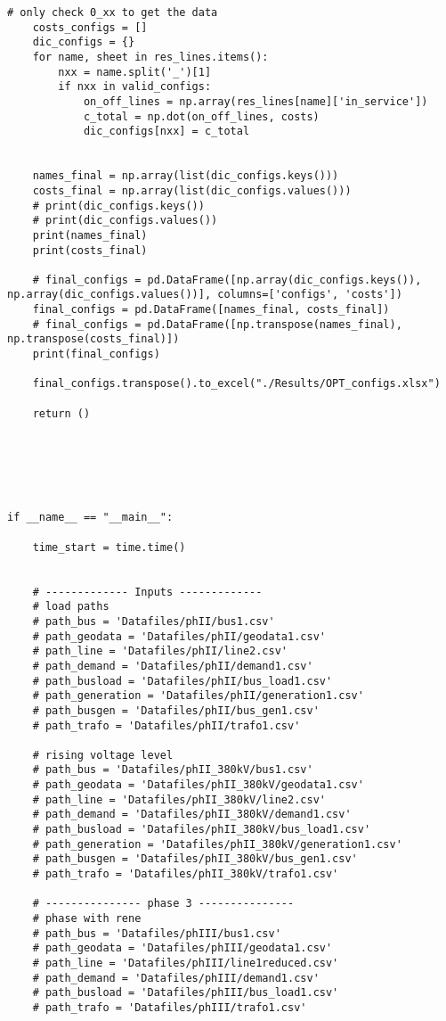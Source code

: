 \begin{lstlisting}[caption={Main code in Python with the Pandapower library}]
    # only check 0_xx to get the data
    costs_configs = []
    dic_configs = {}
    for name, sheet in res_lines.items():
        nxx = name.split('_')[1]
        if nxx in valid_configs:
            on_off_lines = np.array(res_lines[name]['in_service'])
            c_total = np.dot(on_off_lines, costs)
            dic_configs[nxx] = c_total


    names_final = np.array(list(dic_configs.keys()))
    costs_final = np.array(list(dic_configs.values()))
    # print(dic_configs.keys())
    # print(dic_configs.values())
    print(names_final)
    print(costs_final)

    # final_configs = pd.DataFrame([np.array(dic_configs.keys()), np.array(dic_configs.values())], columns=['configs', 'costs'])
    final_configs = pd.DataFrame([names_final, costs_final])
    # final_configs = pd.DataFrame([np.transpose(names_final), np.transpose(costs_final)])
    print(final_configs)

    final_configs.transpose().to_excel("./Results/OPT_configs.xlsx")

    return ()






if __name__ == "__main__":

    time_start = time.time()


    # ------------- Inputs -------------
    # load paths
    # path_bus = 'Datafiles/phII/bus1.csv'
    # path_geodata = 'Datafiles/phII/geodata1.csv'
    # path_line = 'Datafiles/phII/line2.csv'
    # path_demand = 'Datafiles/phII/demand1.csv'
    # path_busload = 'Datafiles/phII/bus_load1.csv'
    # path_generation = 'Datafiles/phII/generation1.csv'
    # path_busgen = 'Datafiles/phII/bus_gen1.csv'
    # path_trafo = 'Datafiles/phII/trafo1.csv'

    # rising voltage level
    # path_bus = 'Datafiles/phII_380kV/bus1.csv'
    # path_geodata = 'Datafiles/phII_380kV/geodata1.csv'
    # path_line = 'Datafiles/phII_380kV/line2.csv'
    # path_demand = 'Datafiles/phII_380kV/demand1.csv'
    # path_busload = 'Datafiles/phII_380kV/bus_load1.csv'
    # path_generation = 'Datafiles/phII_380kV/generation1.csv'
    # path_busgen = 'Datafiles/phII_380kV/bus_gen1.csv'
    # path_trafo = 'Datafiles/phII_380kV/trafo1.csv'

    # --------------- phase 3 ---------------
    # phase with rene
    # path_bus = 'Datafiles/phIII/bus1.csv'
    # path_geodata = 'Datafiles/phIII/geodata1.csv'
    # path_line = 'Datafiles/phIII/line1reduced.csv'
    # path_demand = 'Datafiles/phIII/demand1.csv'
    # path_busload = 'Datafiles/phIII/bus_load1.csv'
    # path_trafo = 'Datafiles/phIII/trafo1.csv'


\end{lstlisting}
